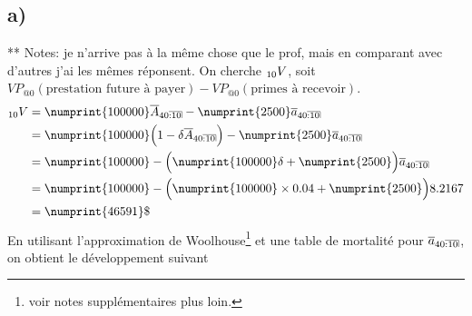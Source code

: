 \documentclass[11pt,french]{report}
\makeatletter
\DeclareRobustCommand{\annuity}[1]{%
\def\arraystretch{0}%
\setlength\arraycolsep{.7pt}%
\setlength\arrayrulewidth{.3pt}%
\begin{array}[b]{@{}c|}\hline
\\[\arraycolsep]%
\scriptstyle #1%
\end{array}%
}
\newcommand{\indiceGauche}[2]{{\vphantom{#2}}_{#1}#2}
\makeatother
\begin{document}
\subsection*{a)} 
** Notes: je n'arrive pas à la même chose que le prof, mais en comparant avec d'autres j'ai les mêmes réponsent.
On cherche $\indiceGauche{10}{V}$, soit $VP_{@0}(\text{prestation future à payer}) - VP_{@0} (\text{primes à recevoir})$.
\begin{align*}
\indiceGauche{10}{V} &= \numprint{100000}\overline{A}_{40\annuity{:10}} - \numprint{2500}\overline{a}_{40\annuity{:10}}\\
&= \numprint{100000}\Big(1 - \delta \overline{A}_{40\annuity{:10}} \Big) - \numprint{2500}\overline{a}_{40\annuity{:10}}\\
&= \numprint{100000} - \Big(\numprint{100000}\delta + \numprint{2500}\Big)\overline{a}_{40\annuity{:10}}\\
&=\numprint{100000} - \Big(\numprint{100000} \times 0.04 + \numprint{2500}\Big)8.2167\\
&= \numprint{46591}\$
\end{align*}
En utilisant l'approximation de Woolhouse\footnote{voir notes supplémentaires plus loin.} et une table de mortalité pour $ \overline{a}_{40\annuity{:10}}$, on obtient le développement suivant
\end{document}
